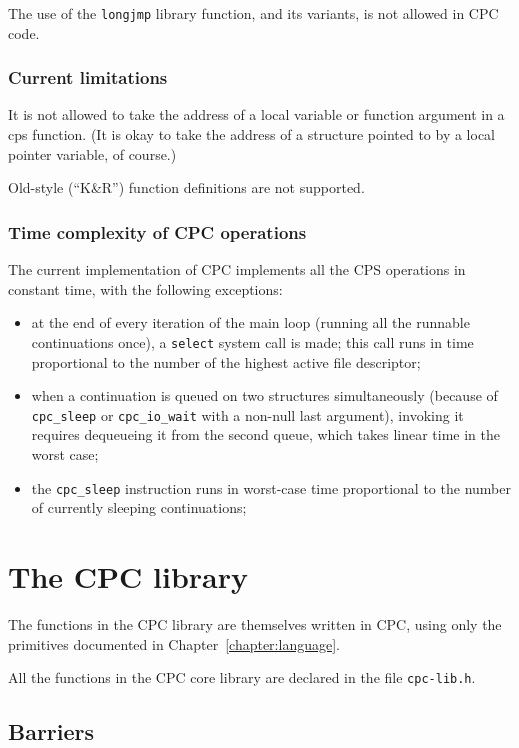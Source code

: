 \documentclass[a4paper]{report}
\begin{document}
The use of the {\tt longjmp} library function, and its variants, is
not allowed in CPC code.

\subsection{Current limitations}

It is not allowed to take the address of a local variable or function
argument in a cps function.  (It is okay to take the address of a
structure pointed to by a local pointer variable, of course.)

Old-style (``K\&R'') function definitions are not supported.

\subsection{Time complexity of CPC operations}

The current implementation of CPC implements all the CPS operations in
constant time, with the following exceptions:
\begin{itemize} 
\item at the end of every iteration of the main loop (running all the
  runnable continuations once), a {\tt select} system call is made; this
  call runs in time proportional to the number of the highest active file
  descriptor;
\item when a continuation is queued on two structures simultaneously
  (because of {\tt cpc\_sleep} or {\tt cpc\_io\_wait} with a non-null
  last argument), invoking it requires dequeueing it from the second
  queue, which takes linear time in the worst case;
\item the {\tt cpc\_sleep} instruction runs in worst-case time
  proportional to the number of currently sleeping continuations;
\end{itemize}

\chapter{The CPC library}

The functions in the CPC library are themselves written in CPC, using
only the primitives documented in Chapter~\ref{chapter:language}.

All the functions in the CPC core library are declared in the file
{\tt cpc-lib.h}.

\section{Barriers}
\end{document}
